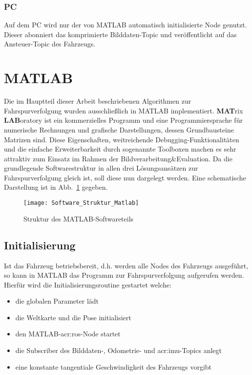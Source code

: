 \subsubsection{PC}
Auf dem PC wird nur der von MATLAB automatisch initialisierte Node genutzt. Dieser abonniert das komprimierte Bilddaten-Topic und veröffentlicht auf das Ansteuer-Topic des Fahrzeugs.

\section{MATLAB}
Die im Hauptteil dieser Arbeit beschriebenen Algorithmen zur Fahrspurverfolgung wurden ausschließlich in MATLAB implementiert. \textbf{MAT}rix \textbf{LAB}oratory ist ein kommerzielles Programm und eine Programmiersprache für numerische Rechnungen und grafische Darstellungen, dessen Grundbausteine Matrizen sind. Diese Eigenschaften, weitreichende Debugging-Funktionalitäten und die einfache Erweiterbarkeit durch sogenannte Toolboxen machen es sehr attraktiv zum Einsatz im Rahmen der Bildverarbeitung\&Evaluation. Da die grundlegende Softwarestruktur in allen drei Lösungsansätzen zur Fahrspurverfolgung gleich ist, soll diese nun dargelegt werden. Eine schematische Darstellung ist in Abb.~\ref{fig:software_struktur:matlab} gegeben.

\begin{figure}[H]
	\centering
	\texttt{[image: Software\_Struktur\_Matlab]}
	\caption{Struktur des MATLAB-Softwareteils}
	\label{fig:software_struktur:matlab}
\end{figure}

\subsection{Initialisierung}
Ist das Fahrzeug betriebsbereit, d.h. werden alle Nodes des Fahrzeugs ausgeführt, so kann in MATLAB das Programm zur Fahrspurverfolgung aufgerufen werden. Hierfür wird die Initialisierungsroutine gestartet welche:
\begin{itemize}
\item die globalen Parameter lädt
\item die Weltkarte und die Pose initialisiert
\item den MATLAB-\gls{acr:ros}-Node startet
\item die Subscriber des Bilddaten-, Odometrie- und \gls{acr:imu}-Topics anlegt
\item eine konstante tangentiale Geschwindigkeit des Fahrzeugs vorgibt 
\end{itemize}

